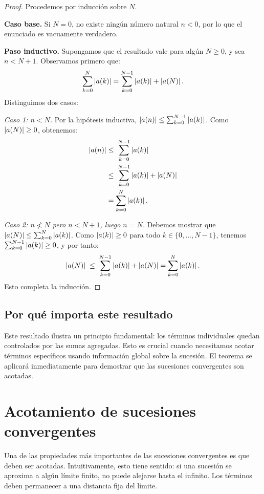 \begin{proof}
Procedemos por inducción sobre $N$.

\medskip
\noindent\textbf{Caso base.} Si $N = 0$, no existe ningún número
natural $n < 0$, por lo que el enunciado es vacuamente verdadero.

\medskip
\noindent\textbf{Paso inductivo.} Supongamos que el resultado vale
para algún $N \ge 0$, y sea $n < N + 1$. Observamos primero que:
\[
  \sum_{k=0}^{N} \left|a(k)\right|
  = \sum_{k=0}^{N-1} \left|a(k)\right| + \left|a(N)\right|.
\]
Distinguimos dos casos:

\medskip
\noindent\textit{Caso 1: $n < N$.} Por la hipótesis inductiva,
$\left|a(n)\right| \le \sum_{k=0}^{N-1} \left|a(k)\right|$.
Como $\left|a(N)\right| \ge 0$, obtenemos:
\begin{align*}
  \left|a(n)\right|
  &\le\; \sum_{k=0}^{N-1} \left|a(k)\right| \\
  &\le\; \sum_{k=0}^{N-1} \left|a(k)\right| + \left|a(N)\right| \\
  &= \sum_{k=0}^{N} \left|a(k)\right|.
\end{align*}

\noindent\textit{Caso 2: $n \not< N$ pero $n < N+1$, luego $n = N$.}
Debemos mostrar que $\left|a(N)\right| \le \sum_{k=0}^{N} \left|a(k)\right|$.
Como $\left|a(k)\right| \ge 0$ para todo $k \in \{0,\ldots,N-1\}$, tenemos
$\sum_{k=0}^{N-1} \left|a(k)\right| \ge 0$, y por tanto:
\[
  \left|a(N)\right|
  \;\le\; \sum_{k=0}^{N-1} \left|a(k)\right| + \left|a(N)\right|
  = \sum_{k=0}^{N} \left|a(k)\right|.
\]
Esto completa la inducción.
\end{proof}

\subsection{Por qué importa este resultado}

Este resultado ilustra un principio fundamental: los términos
individuales quedan controlados por las sumas agregadas. Esto es
crucial cuando necesitamos acotar términos específicos usando
información global sobre la sucesión. El teorema se aplicará
inmediatamente para demostrar que las sucesiones convergentes son
acotadas.

\section{Acotamiento de sucesiones convergentes}

Una de las propiedades más importantes de las sucesiones convergentes
es que deben ser acotadas. Intuitivamente, esto tiene sentido: si una
sucesión se aproxima a algún límite finito, no puede alejarse hasta el
infinito. Los términos deben permanecer a una distancia fija del
límite.

